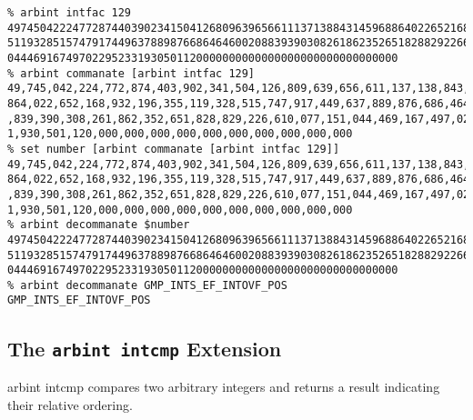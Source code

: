 \begin{tclcommandsampleinvocations}
\begin{scriptsize}
\begin{verbatim}
% arbint intfac 129
4974504222477287440390234150412680963965661113713884314596886402265216893219635
5119328515747917449637889876686464600208839390308261862352651828829226610077151
044469167497022952331930501120000000000000000000000000000000
% arbint commanate [arbint intfac 129]
49,745,042,224,772,874,403,902,341,504,126,809,639,656,611,137,138,843,145,968,
864,022,652,168,932,196,355,119,328,515,747,917,449,637,889,876,686,464,600,208
,839,390,308,261,862,352,651,828,829,226,610,077,151,044,469,167,497,022,952,33
1,930,501,120,000,000,000,000,000,000,000,000,000,000
% set number [arbint commanate [arbint intfac 129]]
49,745,042,224,772,874,403,902,341,504,126,809,639,656,611,137,138,843,145,968,
864,022,652,168,932,196,355,119,328,515,747,917,449,637,889,876,686,464,600,208
,839,390,308,261,862,352,651,828,829,226,610,077,151,044,469,167,497,022,952,33
1,930,501,120,000,000,000,000,000,000,000,000,000,000
% arbint decommanate $number
4974504222477287440390234150412680963965661113713884314596886402265216893219635
5119328515747917449637889876686464600208839390308261862352651828829226610077151
044469167497022952331930501120000000000000000000000000000000
% arbint decommanate GMP_INTS_EF_INTOVF_POS
GMP_INTS_EF_INTOVF_POS
\end{verbatim}
\end{scriptsize}
\end{tclcommandsampleinvocations}

\subsection{The \texttt{arbint intcmp} Extension}
\label{cxtn0:sarb0:scmp0}

\begin{tclcommandname}{arbint intcmp}%
compares two arbitrary integers and returns a result indicating their relative
ordering.
\end{tclcommandname}

\begin{tclcommandsynopsis}
\end{tclcommandsynopsis}

